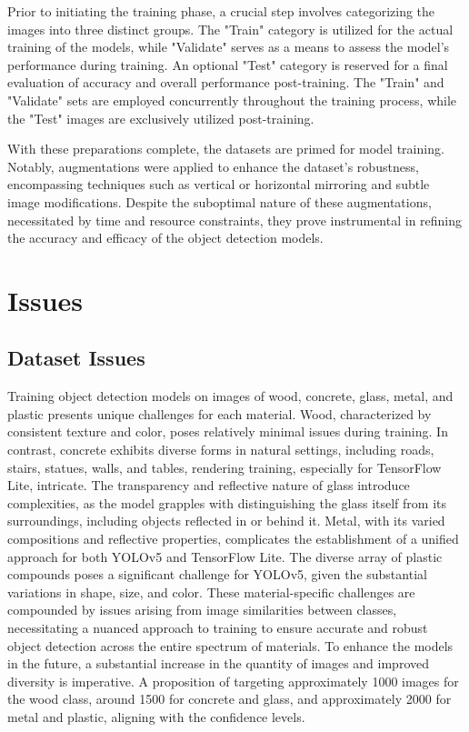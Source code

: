 \documentclass[conference]{IEEEtran}
\begin{document}
Prior to initiating the training phase, a crucial step involves categorizing the images into three distinct groups. The "Train" category is utilized for the actual training of the models, while "Validate" serves as a means to assess the model's performance during training. An optional "Test" category is reserved for a final evaluation of accuracy and overall performance post-training. The "Train" and "Validate" sets are employed concurrently throughout the training process, while the "Test" images are exclusively utilized post-training.

With these preparations complete, the datasets are primed for model training. Notably, augmentations were applied to enhance the dataset's robustness, encompassing techniques such as vertical or horizontal mirroring and subtle image modifications. Despite the suboptimal nature of these augmentations, necessitated by time and resource constraints, they prove instrumental in refining the accuracy and efficacy of the object detection models.

\section{Issues}
\subsection{Dataset Issues}
Training object detection models on images of wood, concrete, glass, metal, and plastic presents unique challenges for each material. Wood, characterized by consistent texture and color, poses relatively minimal issues during training. In contrast, concrete exhibits diverse forms in natural settings, including roads, stairs, statues, walls, and tables, rendering training, especially for TensorFlow Lite, intricate. The transparency and reflective nature of glass introduce complexities, as the model grapples with distinguishing the glass itself from its surroundings, including objects reflected in or behind it. Metal, with its varied compositions and reflective properties, complicates the establishment of a unified approach for both YOLOv5 and TensorFlow Lite. The diverse array of plastic compounds poses a significant challenge for YOLOv5, given the substantial variations in shape, size, and color. These material-specific challenges are compounded by issues arising from image similarities between classes, necessitating a nuanced approach to training to ensure accurate and robust object detection across the entire spectrum of materials. To enhance the models in the future, a substantial increase in the quantity of images and improved diversity is imperative. A proposition of targeting approximately 1000 images for the wood class, around 1500 for concrete and glass, and approximately 2000 for metal and plastic, aligning with the confidence levels.
\end{document}
